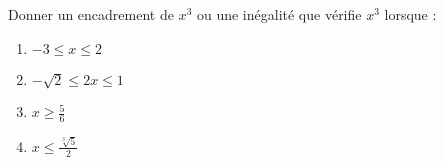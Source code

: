 
Donner un encadrement de $x^3$ ou une inégalité que vérifie $x^3$ lorsque :  
 \begin{enumerate}
 \item $-3 \leq x \leq 2$
  \item $-\sqrt 2 \leq 2x \leq 1$
 \item $  x \geq \frac{5}{6}$
 \item $  x \leq \frac{\sqrt[3]{5}}{2}$ 
 \end{enumerate}

